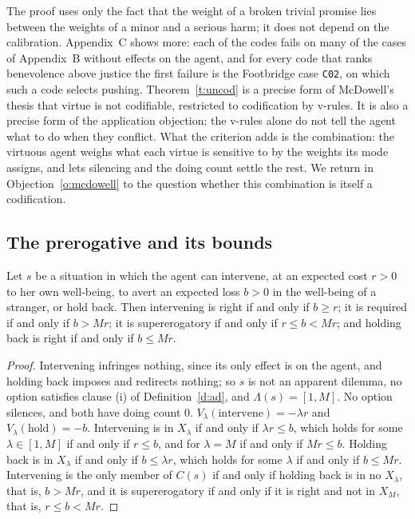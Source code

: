 \documentclass{situationist-preprint}
\newcommand{\Ch}{C}
\begin{document}
The proof uses only the fact that the weight of a broken trivial promise lies between the weights of a minor and a serious harm; it does not depend on the calibration. Appendix~C shows more: each of the \stnorders{} codes fails on many of the \stnnoself{} cases of Appendix~B without effects on the agent, and for every code that ranks benevolence above justice the first failure is the Footbridge case \texttt{C02}, on which such a code selects pushing. Theorem~\ref{t:uncod} is a precise form of McDowell's thesis that virtue is not codifiable, restricted to codification by v-rules. It is also a precise form of the application objection: the v-rules alone do not tell the agent what to do when they conflict. What the criterion adds is the combination: the virtuous agent weighs what each virtue is sensitive to by the weights its mode assigns, and lets silencing and the doing count settle the rest. We return in Objection~\ref{o:mcdowell} to the question whether this combination is itself a codification.

\subsection{The prerogative and its bounds}

\begin{proposition}[Rescue]\label{p:prerog}
Let $s$ be a situation in which the agent can intervene, at an expected cost $r>0$ to her own well-being, to avert an expected loss $b>0$ in the well-being of a stranger, or hold back. Then intervening is right if and only if $b\geq r$; it is required if and only if $b>Mr$; it is supererogatory if and only if $r\leq b<Mr$; and holding back is right if and only if $b\leq Mr$.
\end{proposition}

\begin{proof}
Intervening infringes nothing, since its only effect is on the agent, and holding back imposes and redirects nothing; so $s$ is not an apparent dilemma, no option satisfies clause (i) of Definition~\ref{d:ad}, and $\Lambda(s)=[1,M]$. No option silences, and both have doing count $0$. $V_\lambda(\text{intervene})=-\lambda r$ and $V_\lambda(\text{hold})=-b$. Intervening is in $X_\lambda$ if and only if $\lambda r\leq b$, which holds for some $\lambda\in[1,M]$ if and only if $r\leq b$, and for $\lambda=M$ if and only if $Mr\leq b$. Holding back is in $X_\lambda$ if and only if $b\leq\lambda r$, which holds for some $\lambda$ if and only if $b\leq Mr$. Intervening is the only member of $\Ch(s)$ if and only if holding back is in no $X_\lambda$, that is, $b>Mr$, and it is supererogatory if and only if it is right and not in $X_M$, that is, $r\leq b<Mr$.
\end{proof}
\end{document}
